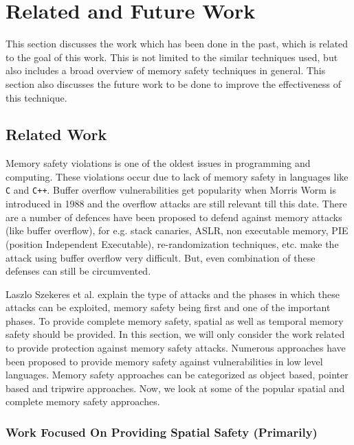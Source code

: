 
\chapter{Related and Future Work}

This section discusses the work which has been done in the past, which is related to the goal of this work. This is not limited to the similar techniques used, but also includes a broad overview of memory safety techniques in general. This section also discusses the future work to be done to improve the effectiveness of this technique.

\section{Related Work}

Memory safety violations is one of the oldest issues in programming and computing. These violations occur due to lack of memory safety in languages like \texttt{C} and \texttt{C++}. Buffer overflow vulnerabilities get popularity when Morris Worm \citep{Spafford:1989:IWP:66093.66095} is introduced in 1988 and the overflow attacks are still relevant till this date. There are a number of defences have been proposed to defend against memory attacks (like buffer overflow), for e.g. stack canaries, ASLR, non executable memory, PIE (position Independent Executable), re-randomization techniques, etc. make the attack using buffer overflow very difficult. But, even combination of these defenses can still be circumvented.

Laszlo Szekeres et al. \citep{6547101} explain the type of attacks and the phases in which these attacks can be exploited, memory safety being first and one of the important phases. To provide complete memory safety, spatial as well as temporal memory safety should be provided. In this section, we will only consider the work related to provide protection against memory safety attacks. Numerous approaches have been proposed to provide memory safety against vulnerabilities in low level languages. Memory safety approaches can be categorized as object based, pointer based and tripwire approaches. Now, we look at some of the popular spatial and complete memory safety approaches.

\subsection{Work Focused On Providing Spatial Safety (Primarily)}

